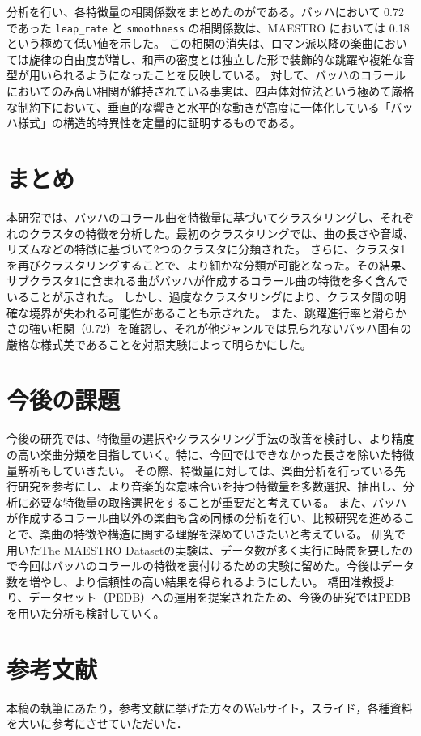 分析を行い、各特徴量の相関係数をまとめたのがである。バッハにおいて 0.72 であった \texttt{leap\_rate} と \texttt{smoothness} の相関係数は、MAESTRO においては 0.18 という極めて低い値を示した。
この相関の消失は、ロマン派以降の楽曲においては旋律の自由度が増し、和声の密度とは独立した形で装飾的な跳躍や複雑な音型が用いられるようになったことを反映している。
対して、バッハのコラールにおいてのみ高い相関が維持されている事実は、四声体対位法という極めて厳格な制約下において、垂直的な響きと水平的な動きが高度に一体化している「バッハ様式」の構造的特異性を定量的に証明するものである。


\section{まとめ}
本研究では、バッハのコラール曲を特徴量に基づいてクラスタリングし、それぞれのクラスタの特徴を分析した。最初のクラスタリングでは、曲の長さや音域、リズムなどの特徴に基づいて2つのクラスタに分類された。
さらに、クラスタ1を再びクラスタリングすることで、より細かな分類が可能となった。その結果、サブクラスタ1に含まれる曲がバッハが作成するコラール曲の特徴を多く含んでいることが示された。
しかし、過度なクラスタリングにより、クラスタ間の明確な境界が失われる可能性があることも示された。
また、跳躍進行率と滑らかさの強い相関（0.72）を確認し、それが他ジャンルでは見られないバッハ固有の厳格な様式美であることを対照実験によって明らかにした。

\section{今後の課題}
今後の研究では、特徴量の選択やクラスタリング手法の改善を検討し、より精度の高い楽曲分類を目指していく。特に、今回ではできなかった長さを除いた特徴量解析もしていきたい。
その際、特徴量に対しては、楽曲分析を行っている先行研究を参考にし、より音楽的な意味合いを持つ特徴量を多数選択、抽出し、分析に必要な特徴量の取捨選択をすることが重要だと考えている。
また、バッハが作成するコラール曲以外の楽曲も含め同様の分析を行い、比較研究を進めることで、楽曲の特徴や構造に関する理解を深めていきたいと考えている。
研究で用いたThe MAESTRO Datasetの実験は、データ数が多く実行に時間を要したので今回はバッハのコラールの特徴を裏付けるための実験に留めた。今後はデータ数を増やし、より信頼性の高い結果を得られるようにしたい。
橋田准教授より、データセット（PEDB）への運用を提案されたため、今後の研究ではPEDBを用いた分析も検討していく。

\section{参考文献}
\label{sec:refcheck}

 


\begin{acknowledgment}
  本稿の執筆にあたり，参考文献に挙げた方々のWebサイト，スライド，各種資料を大いに参考にさせていただいた．
\end{acknowledgment}

